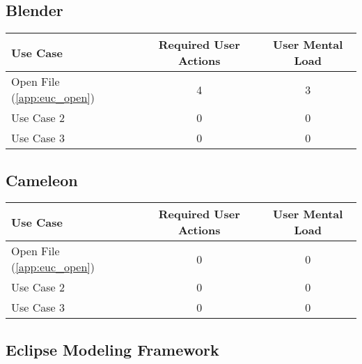 \subsection*{Blender}




\begin{tabularx}{\textwidth}{Xcc}
\textbf{Use Case} & \textbf{Required User Actions} & \textbf{User Mental Load}\\
\hline
Open File (\ref{app:euc_open}) & 4 & 3 \\
Use Case 2                     & 0 & 0 \\
Use Case 3                     & 0 & 0
\end{tabularx}

\subsection*{Cameleon}

\begin{tabularx}{\textwidth}{Xcc}
\textbf{Use Case} & \textbf{Required User Actions} & \textbf{User Mental Load}\\
\hline
Open File (\ref{app:euc_open}) & 0 & 0 \\
Use Case 2                     & 0 & 0 \\
Use Case 3                     & 0 & 0
\end{tabularx}

\subsection*{Eclipse Modeling Framework}

